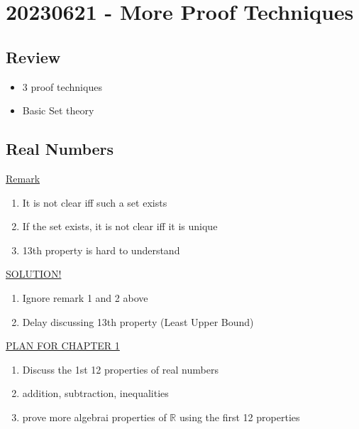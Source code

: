 \documentclass{report}
\begin{document}
\section*{20230621 - More Proof Techniques}%
  \subsection*{Review}%
  \begin{itemize}
    \item 3 proof techniques
    \item Basic Set theory
  \end{itemize}

  \subsection*{Real Numbers}%

    \underline{Remark}
    \begin{enumerate}
      \item It is not clear iff such a set exists
      \item If the set exists, it is not clear iff it is unique
      \item 13th property is hard to understand
    \end{enumerate}

    \underline{SOLUTION!}
    \begin{enumerate}
      \item Ignore remark 1 and 2 above
      \item Delay discussing 13th property (Least Upper Bound)
    \end{enumerate}

    \underline{PLAN FOR CHAPTER 1}
    \begin{enumerate}
      \item Discuss the 1st 12 properties of real numbers
      \item addition, subtraction, inequalities
      \item prove more algebrai properties of $\mathbb{R}$ using the
        first 12 properties
    \end{enumerate}
\end{document}

